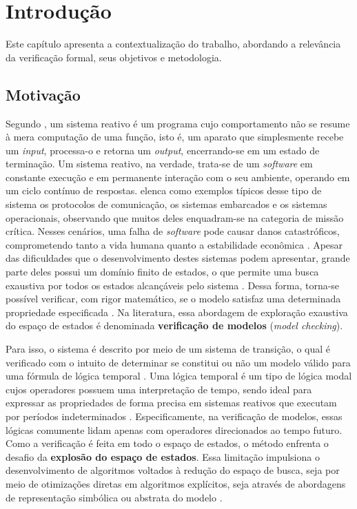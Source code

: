 \documentclass[cic,tc]{infufrgs}
\begin{document}
	\tableofcontents
	\listoffigures
	\listoftables
	
	\chapter{Introdução}
	
	Este capítulo apresenta a contextualização do trabalho, abordando a relevância da verificação formal, seus objetivos e metodologia.
	
	\section{Motivação}
	
	Segundo , um sistema reativo é um programa cujo comportamento não se resume à mera computação de uma função, isto é, um aparato que simplesmente recebe um \textit{input}, processa-o e retorna um \textit{output}, encerrando-se em um estado de terminação. 
	Um sistema reativo, na verdade, trata-se de um \textit{software} em constante execução e em permanente interação com o seu ambiente, operando em um ciclo contínuo de respostas.
	 elenca como exemplos típicos desse tipo de sistema os protocolos de comunicação, os sistemas embarcados e os sistemas operacionais, observando que muitos deles enquadram-se na categoria de missão crítica. 
	Nesses cenários, uma falha de \textit{software} pode causar danos catastróficos, comprometendo tanto a vida humana quanto a estabilidade econômica \cite{emerson25mc2008, baierPrinciplesModelChecking2008a}. 
	Apesar das dificuldades que o desenvolvimento destes sistemas podem apresentar, grande parte deles possui um domínio finito de estados, o que permite uma busca exaustiva por todos os estados alcançáveis pelo sistema \cite{clarkeModelChecking2018}. 
	Dessa forma, torna-se possível verificar, com rigor matemático, se o modelo satisfaz uma determinada propriedade especificada \cite{baierPrinciplesModelChecking2008a}. 
	Na literatura, essa abordagem de exploração exaustiva do espaço de estados é denominada \textbf{verificação de modelos} (\textit{model checking}).
	
	Para isso, o sistema é descrito por meio de um sistema de transição, o qual é verificado com o intuito de determinar se constitui ou não um modelo válido para uma fórmula de lógica temporal \cite{huthLogicComputerScience2000}. 
	Uma lógica temporal é um tipo de lógica modal cujos operadores possuem uma interpretação de tempo, sendo ideal para expressar as propriedades de forma precisa em sistemas reativos que executam por períodos indeterminados \cite{emerson25mc2008}. 
	Especificamente, na verificação de modelos, essas lógicas comumente lidam apenas com operadores direcionados ao tempo futuro. 
	Como a verificação é feita em todo o espaço de estados, o método enfrenta o desafio da \textbf{explosão do espaço de estados}. 
	Essa limitação impulsiona o desenvolvimento de algoritmos voltados à redução do espaço de busca, seja por meio de otimizações diretas em algoritmos explícitos, seja através de abordagens de representação simbólica ou abstrata do modelo \cite{huthLogicComputerScience2000, clarkeModelChecking2018}.
	
\end{document}
